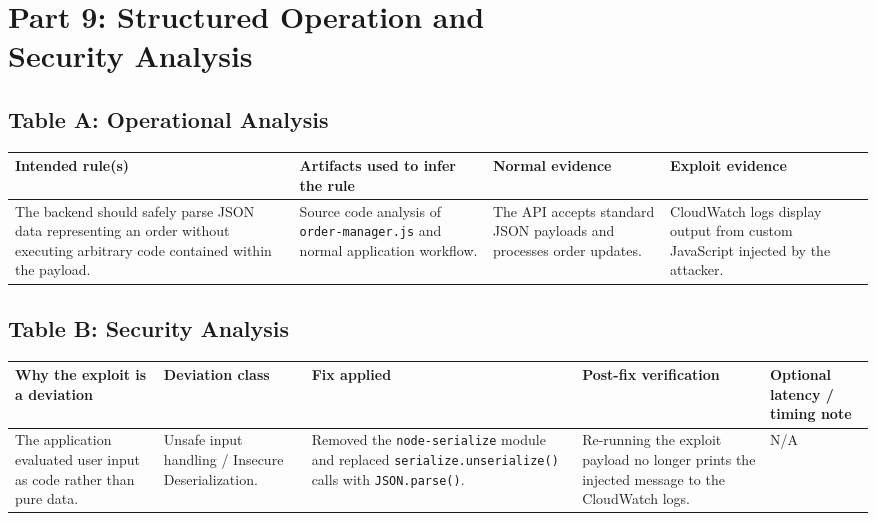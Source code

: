 \documentclass[12pt]{report}
\begin{document}
\section[Part 9: Structured Operation and Security Analysis]{Part 9: Structured Operation and\\Security Analysis}
\subsection*{Table A: Operational Analysis}
\begin{table}[H]
  \small
  \centering
  \begin{tabularx}{\textwidth}{|Y|Y|Y|Y|}
    \hline
    \textbf{Intended rule(s)} & \textbf{Artifacts used to infer the rule} & \textbf{Normal evidence} & \textbf{Exploit evidence} \\
    \hline
    The backend should safely parse JSON data representing an order without executing arbitrary code contained within the payload. &
    Source code analysis of \nolinkurl{order-manager.js} and normal application workflow. &
    The API accepts standard JSON payloads and processes order updates. &
    CloudWatch logs display output from custom JavaScript injected by the attacker. \\
    \hline
  \end{tabularx}
\end{table}

\subsection*{Table B: Security Analysis}
\begin{table}[H]
  \footnotesize
  \centering
  \begin{tabularx}{\textwidth}{|Y|Y|Y|Y|Y|}
    \hline
    \textbf{Why the exploit is a deviation} & \textbf{Deviation class} & \textbf{Fix applied} & \textbf{Post-fix verification} & \textbf{Optional latency / timing note} \\
    \hline
    The application evaluated user input as code rather than pure data. &
    Unsafe input handling / Insecure Deserialization. &
    Removed the \nolinkurl{node-serialize} module and replaced \nolinkurl{serialize.unserialize()} calls with \nolinkurl{JSON.parse()}. &
    Re-running the exploit payload no longer prints the injected message to the CloudWatch logs. &
    N/A \\
    \hline
  \end{tabularx}
\end{table}
\end{document}
